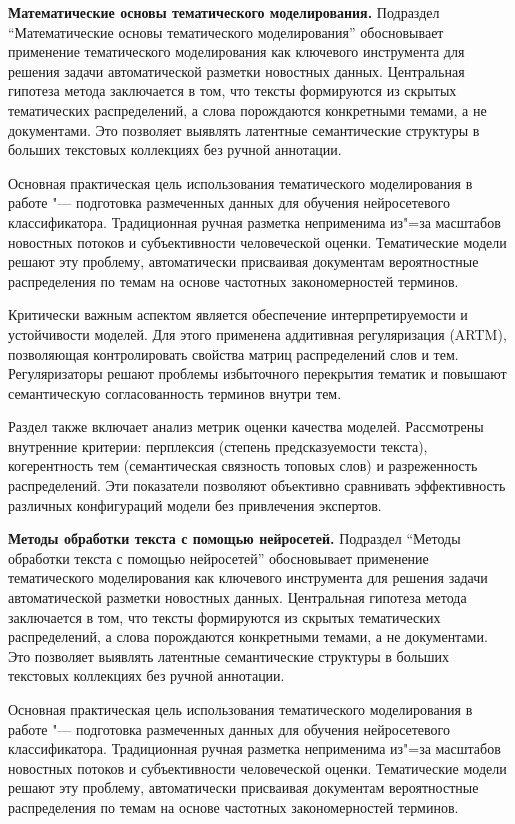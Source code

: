\documentclass[autoref]{SCWorks}
\begin{document}
\textbf{Математические основы тематического моделирования.}
Подраздел \enquote{Математические основы тематического моделирования}
обосновывает применение тематического моделирования как ключевого инструмента
для решения задачи автоматической разметки новостных данных. Центральная
гипотеза метода заключается в том, что тексты формируются из скрытых
тематических распределений, а слова порождаются конкретными темами, а не
документами. Это позволяет выявлять латентные семантические структуры в больших
текстовых коллекциях без ручной аннотации.

Основная практическая цель использования тематического моделирования в работе
"--- подготовка размеченных данных для обучения нейросетевого классификатора.
Традиционная ручная разметка неприменима из"=за масштабов новостных потоков и
субъективности человеческой оценки. Тематические модели решают эту проблему,
автоматически присваивая документам вероятностные распределения по темам на
основе частотных закономерностей терминов.

Критически важным аспектом является обеспечение интерпретируемости и
устойчивости моделей. Для этого применена аддитивная регуляризация (ARTM),
позволяющая контролировать свойства матриц распределений слов и тем.
Регуляризаторы решают проблемы избыточного перекрытия тематик и повышают
семантическую согласованность терминов внутри тем.

Раздел также включает анализ метрик оценки качества моделей. Рассмотрены
внутренние критерии: перплексия (степень предсказуемости текста), когерентность
тем (семантическая связность топовых слов) и разреженность распределений. Эти
показатели позволяют объективно сравнивать эффективность различных конфигураций
модели без привлечения экспертов.

\textbf{Методы обработки текста с помощью нейросетей.}
Подраздел \enquote{Методы обработки текста с помощью нейросетей} обосновывает
применение тематического моделирования как ключевого инструмента для решения
задачи автоматической разметки новостных данных. Центральная гипотеза метода
заключается в том, что тексты формируются из скрытых тематических распределений,
а слова порождаются конкретными темами, а не документами. Это позволяет выявлять
латентные семантические структуры в больших текстовых коллекциях без ручной
аннотации.

Основная практическая цель использования тематического моделирования в работе
"--- подготовка размеченных данных для обучения нейросетевого классификатора.
Традиционная ручная разметка неприменима из"=за масштабов новостных потоков и
субъективности человеческой оценки. Тематические модели решают эту проблему,
автоматически присваивая документам вероятностные распределения по темам на
основе частотных закономерностей терминов.
\end{document}
